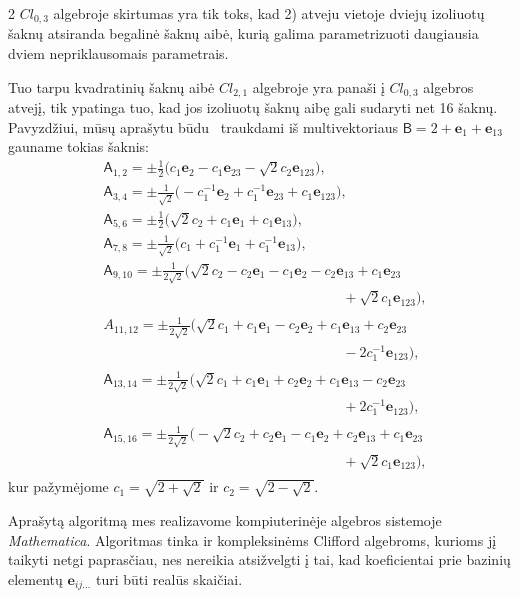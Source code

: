 \documentclass[a4paper,10pt,lithuanian]{article}
\newcommand{\e}{\mathrm{e}}
\def\A{\mathsf{A}}
\def\B{\mathsf{B}}
\newcommand{\cl}[2]{\ensuremath{\mathit{Cl}_{#1,#2}}}
\def\e#1{\mathbf{e}_{#1}} %
\begin{document}
\begin{multicols*}{2}
$\cl{0}{3}$ algebroje skirtumas yra tik toks, kad 2) atveju vietoje dviejų izoliuotų šaknų atsiranda begalinė šaknų aibė, kurią galima parametrizuoti daugiausia dviem nepriklausomais parametrais. 
  
  Tuo tarpu kvadratinių šaknų aibė $\cl{2}{1}$ algebroje yra panaši į $\cl{0}{3}$ algebros atvejį, tik  ypatinga tuo, kad jos izoliuotų šaknų aibę gali sudaryti net 16 šaknų. Pavyzdžiui, mūsų aprašytu būdu~\cite{AcusDargys2019} traukdami iš multivektoriaus $\B=2+\e{1}+\e{13}$ gauname tokias šaknis:
\begin{equation}
\begin{split}
  &\A_{1,2}=\pm\tfrac{1}{2}\big(c_1 \e{2}-c_1 \e{2 3}-\sqrt{2}c_2\e{123}\big),\\
 &\A_{3,4}=\pm\tfrac{1}{\sqrt{2}}\big(-c_1^{-1}\e{2}+c_1^{-1}\e{2 3}+c_1 \e{1 2 3}\big),\\
&\A_{5,6}=\pm\tfrac{1}{2}\big(\sqrt{2}c_2+c_1\e{1}+c_1\e{13}\big),\\
&\A_{7,8}=\pm\tfrac{1}{\sqrt{2}}\big(c_1+ c_1^{-1}\e{1}+c_1^{-1}\e{1 3}\big),\\
&\A_{9,10}=\pm\tfrac{1}{2\sqrt{2}}\big(\sqrt{2}c_2-c_2\e{1}-c_1\e{2}-c_2\e{13}+c_1\e{2 3}\\
&\phantom{A_{11,12}=\pm\tfrac{1}{2\sqrt{2}}\big(\sqrt{2}c_ 1+c_1 \e{1} -c_ 2 \e{2}+c_1} 
  +\sqrt{2}c_1 \e{1 2 3}\big),\\
  &A_{11,12}=\pm\tfrac{1}{2\sqrt{2}}\big(\sqrt{2}c_ 1+c_1 \e{1}-c_ 2 \e{2}+c_1 \e{1 3}+c_2 \e{2 3}\\
&\phantom{A_{11,12}=\pm\tfrac{1}{2\sqrt{2}}\big(\sqrt{2}c_ 1+c_1 \e{1} -c_ 2 \e{2}+c_1} 
 -2c_1^{-1}\e{1 2 3}\big),\\
&\A_{13,14}=\pm\tfrac{1}{2\sqrt{2}}\big(\sqrt{2}c_1+c_1 \e{1}+c_2 \e{2}+c_1 \e{1 3}-c_2 \e{2 3}\\
&\phantom{A_{11,12}=\pm\tfrac{1}{2\sqrt{2}}\big(\sqrt{2}c_ 1+c_1 \e{1} -c_ 2 \e{2}+c_1} 
  +2c_1^{-1}\e{1 2 3}\big),\\
&\A_{15,16}=\pm\tfrac{1}{2\sqrt{2}}\big(-\sqrt{2}c_2+c_2 \e{1}-c_1
\e{2}+c_2 \e{13}+c_1 \e{2 3}\\
&\phantom{A_{11,12}=\pm\tfrac{1}{2\sqrt{2}}\big(\sqrt{2}c_ 1+c_1 \e{1} -c_ 2 \e{2}+c_1} 
  +\sqrt{2}c_1 \e{1 2 3}\big),
\end{split}\end{equation}
kur pažymėjome $c_1=\sqrt{2+\sqrt{2}}$ ir $c_2=\sqrt{2-\sqrt{2}}$.
  
  
  Aprašytą algoritmą mes realizavome kompiuterinėje algebros sistemoje {\it Mathematica}. Algoritmas tinka ir kompleksinėms Clifford algebroms, kurioms jį taikyti netgi paprasčiau, nes nereikia atsižvelgti į tai, kad koeficientai prie bazinių elementų $\e{ij\ldots}$ turi būti realūs skaičiai.




\end{multicols*}
\end{document}
